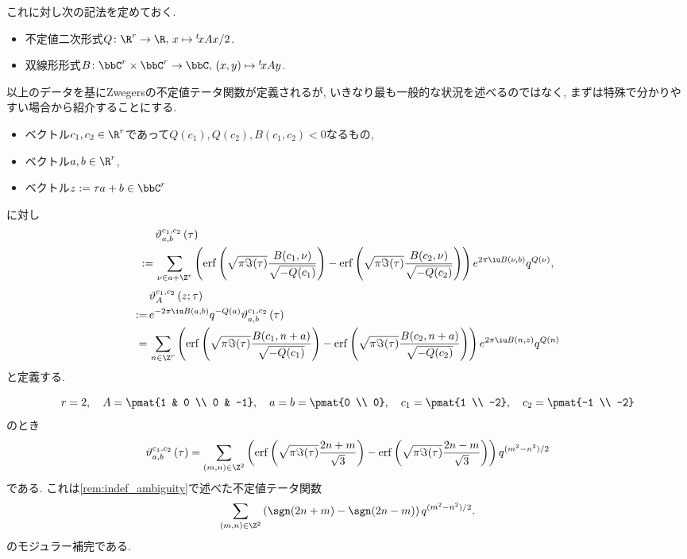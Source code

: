 \documentclass[11pt,b5paper,oneside,lualatex]{ltjsarticle} %
\DeclareMathOperator{\erf}{erf}
\numberwithin{equation}{section} %
\begin{document}
これに対し次の記法を定めておく. 

\begin{nota}
	\begin{itemize}
		\item 不定値二次形式$ Q \colon \R^r \to \R, \, x \mapsto {}^t\!x A x /2 $.
		\item 双線形形式$ B \colon \bbC^r \times \bbC^r \to \bbC, \, (x, y) \mapsto {}^t\!x A y $.
	\end{itemize}
\end{nota}

以上のデータを基にZwegersの不定値テータ関数が定義されるが, いきなり最も一般的な状況を述べるのではなく, まずは特殊で分かりやすい場合から紹介することにする. 

\begin{dfn}
	\label{dfn:Zwegers_theta_special}
	\leavevmode %
	\begin{itemize}
		\item ベクトル$ c_1, c_2 \in \R^r $であって$ Q(c_1), Q(c_2), B(c_1, c_2) < 0 $なるもの,
		\item ベクトル$ a, b \in \R^r $,
		\item ベクトル$ z := \tau a + b \in \bbC^r $
	\end{itemize}
	に対し	
	\begin{align}
		&\vartheta_{a, b}^{c_1, c_2} \left( \tau \right)
		\\
		:= \,
		&\sum_{\nu \in a + \Z^r}
		\left( \erf \left( \sqrt{\pi \Im(\tau)} \frac{B(c_1, \nu)}{\sqrt{-Q(c_1)}} \right) - \erf \left( \sqrt{\pi \Im(\tau)} \frac{B(c_2, \nu)}{\sqrt{-Q(c_2)}} \right) \right)
		e^{2\pi \iu B(\nu, b)} q^{Q(\nu)},
	\end{align}
	\begin{align}
		&\vartheta_{A}^{c_1, c_2} \left( z; \tau \right)
		\\
		:= \,
		&e^{-2\pi \iu B(a, b)} q^{-Q(a)} \vartheta_{a, b}^{c_1, c_2} \left( \tau \right)
		\\
		= \,
		&\sum_{n \in \Z^r}
		\left( \erf \left( \sqrt{\pi \Im(\tau)} \frac{B(c_1, n + a)}{\sqrt{-Q(c_1)}} \right) - \erf \left( \sqrt{\pi \Im(\tau)} \frac{B(c_2, n + a)}{\sqrt{-Q(c_2)}} \right) \right)
		e^{2\pi \iu B(n, z)} q^{Q(n)}
	\end{align}
	と定義する. 
\end{dfn}

\begin{ex}
	\[
	 r = 2, \quad
	 A = \pmat{1 & 0 \\ 0 & -1}, \quad
	 a = b = \pmat{0 \\ 0}, \quad
	 c_1= \pmat{1 \\ -2}, \quad
	 c_2= \pmat{-1 \\ -2}
	\]
	のとき
	\[
	\vartheta_{a, b}^{c_1, c_2} \left( \tau \right)
	=
	\sum_{(m, n) \in \Z^2}
	\left( \erf \left( \sqrt{\pi \Im(\tau)} \frac{2n+m}{\sqrt{3}} \right) - \erf \left( \sqrt{\pi \Im(\tau)} \frac{2n-m}{\sqrt{3}} \right) \right)
	q^{(m^2 - n^2)/2}
	\]
	である. 
	これは\cref{rem:indef_ambiguity}で述べた不定値テータ関数
	\[
	\sum_{(m, n) \in \Z^2} \left( \sgn(2n+m) - \sgn(2n-m) \right) q^{(m^2 - n^2)/2}.
	\]
	のモジュラー補完である. 
\end{ex}
\end{document}
